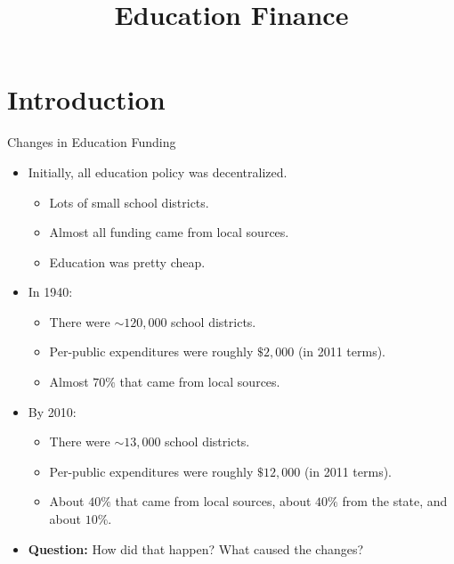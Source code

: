 \documentclass{beamer}
\title{Education Finance}
\begin{document}
\maketitle

\section{Introduction}

\begin{frame}{Changes in Education Funding}
\begin{itemize}
\item Initially, all education policy was decentralized. 
	\begin{itemize}
	\item Lots of small school districts. 
	\item Almost all funding came from local sources. 
	\item Education was pretty cheap.
	\end{itemize}
\item In 1940:
	\begin{itemize}
	\item There were $\sim 120,000$ school districts.
	\item Per-public expenditures were roughly $\$2,000$ (in 2011 terms).
	\item Almost $70\%$ that came from local sources.
	\end{itemize}
\item By 2010:
	\begin{itemize}
	\item There were $\sim 13,000$ school districts.
	\item Per-public expenditures were roughly $\$12,000$ (in 2011 terms).
	\item About $40\%$ that came from local sources, about $40\%$ from the state, and about $10\%$.
	\end{itemize}
\pause
\item \textbf{Question:} How did that happen? What caused the changes?
\end{itemize}
\end{frame}
\end{document}
